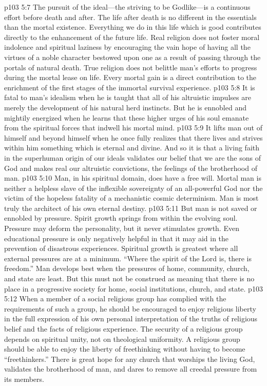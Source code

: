 \pc \vs p103 5:7 The pursuit of the ideal---the striving to be Godlike---is a continuous effort before death and after. The life after death is no different in the essentials than the mortal existence. Everything we do in this life which is good contributes directly to the enhancement of the future life. Real religion does not foster moral indolence and spiritual laziness by encouraging the vain hope of having all the virtues of a noble character bestowed upon one as a result of passing through the portals of natural death. True religion does not belittle man’s efforts to progress during the mortal lease on life. Every mortal gain is a direct contribution to the enrichment of the first stages of the immortal survival experience.
\pc \vs p103 5:8 It is fatal to man’s idealism when he is taught that all of his altruistic impulses are merely the development of his natural herd instincts. But he is ennobled and mightily energized when he learns that these higher urges of his soul emanate from the spiritual forces that indwell his mortal mind.
\vs p103 5:9 It lifts man out of himself and beyond himself when he once fully realizes that there lives and strives within him something which is eternal and divine. And so it is that a living faith in the superhuman origin of our ideals validates our belief that we are the sons of God and makes real our altruistic convictions, the feelings of the brotherhood of man.
\vs p103 5:10 Man, in his spiritual domain, does have a free will. Mortal man is neither a helpless slave of the inflexible sovereignty of an all\hyp{}powerful God nor the victim of the hopeless fatality of a mechanistic cosmic determinism. Man is most truly the architect of his own eternal destiny.
\pc \vs p103 5:11 But man is not saved or ennobled by pressure. Spirit growth springs from within the evolving soul. Pressure may deform the personality, but it never stimulates growth. Even educational pressure is only negatively helpful in that it may aid in the prevention of disastrous experiences. Spiritual growth is greatest where all external pressures are at a minimum. “Where the spirit of the Lord is, there is freedom.” Man develops best when the pressures of home, community, church, and state are least. But this must not be construed as meaning that there is no place in a progressive society for home, social institutions, church, and state.
\vs p103 5:12 When a member of a social religious group has complied with the requirements of such a group, he should be encouraged to enjoy religious liberty in the full expression of his own personal interpretation of the truths of religious belief and the facts of religious experience. The security of a religious group depends on spiritual unity, not on theological uniformity. A religious group should be able to enjoy the liberty of freethinking without having to become “freethinkers.” There is great hope for any church that worships the living God, validates the brotherhood of man, and dares to remove all creedal pressure from its members.
